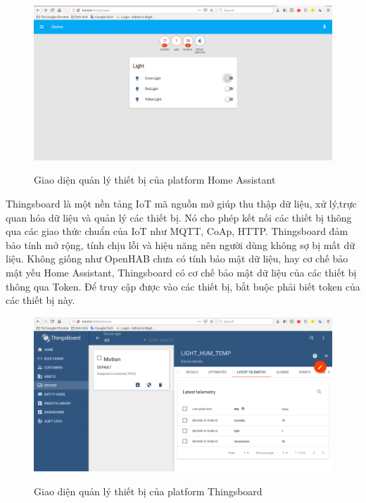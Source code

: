 \begin{figure}[h!]
	\center
	\includegraphics[scale=0.3]{image/homeassistant} \\
	\caption{Giao diện quản lý thiết bị của platform Home Assistant}
	\label{fig:giao_dien_homeassistant}
\end{figure}


Thingsboard là một nền tảng IoT mã nguồn mở giúp thu thập dữ liệu, xử lý,trực quan hóa dữ liệu và quản lý các thiết bị. Nó cho phép kết nối các thiết bị thông qua các giao thức chuẩn của IoT như MQTT, CoAp, HTTP. Thingsboard đảm bảo tính mở rộng, tính chịu lỗi và hiệu năng nên người dùng không sợ bị mất dữ liệu. Không giống như OpenHAB chưa có tính bảo mật dữ liệu, hay cơ chế bảo mật yếu Home Assistant, Thingsboard có cơ chế bảo mật dữ liệu của các thiết bị thông qua Token. Để truy cập được vào các thiết bị, bắt buộc phải biết token của các thiết bị này.

\begin{figure}[h!]
	\center
	\includegraphics[scale=0.3]{image/thingsboard} \\
	\caption{Giao diện quản lý thiết bị của platform Thingsboard}
	\label{fig:giao_dien_thingsboard}
\end{figure}


